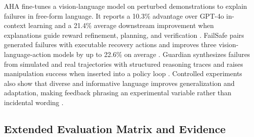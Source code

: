 AHA fine-tunes a vision-language model on perturbed demonstrations to explain failures in free-form language. It reports a 10.3\% advantage over GPT-4o in-context learning and a 21.4\% average downstream improvement when explanations guide reward refinement, planning, and verification \citep{duan2024aha}. FailSafe pairs generated failures with executable recovery actions and improves three vision-language-action models by up to 22.6\% on average \citep{lin2025failsafe}. Guardian synthesizes failures from simulated and real trajectories with structured reasoning traces and raises manipulation success when inserted into a policy loop \citep{pacaud2025scaling}. Controlled experiments also show that diverse and informative language improves generalization and adaptation, making feedback phrasing an experimental variable rather than incidental wording \citep{xi2024teaching}.

\subsection{Extended Evaluation Matrix and Evidence}
\label{supp:evaluation-evidence}

